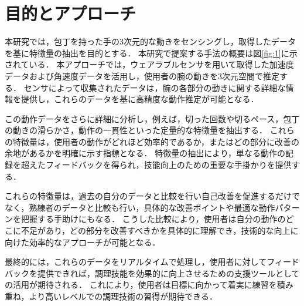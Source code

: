 \section{目的とアプローチ}
本研究では，包丁を持った手の3次元的な動きをセンシングし，取得したデータを基に特徴量の抽出を目的とする．
本研究で提案する手法の概要は図\ref{fig:1}に示されている．
本アプローチでは，ウェアラブルセンサを用いて取得した加速度データおよび角速度データを活用し，使用者の腕の動きを3次元空間で推定する．
センサによって収集されたデータは，腕の各部分の動きに関する詳細な情報を提供し，これらのデータを基に高精度な動作推定が可能となる．

この動作データをさらに詳細に分析し，例えば，切った回数や切るペース，包丁の動きの滑らかさ，動作の一貫性といった定量的な特徴量を抽出する．
これらの特徴量は，使用者の動作がどれほど効率的であるか，またはどの部分に改善の余地があるかを明確に示す指標となる．
特徴量の抽出により，単なる動作の記録を超えたフィードバックを得られ，技能向上のための重要な手掛かりを提供する．

これらの特徴量は，過去の自分のデータと比較を行い自己改善を促進するだけでなく，熟練者のデータと比較も行い，具体的な改善ポイントや最適な動作パターンを把握する手助けにもなる．
こうした比較により，使用者は自分の動作のどこに不足があり，どの部分を改善すべきかを具体的に理解でき，技術的な向上に向けた効率的なアプローチが可能となる．

最終的には，これらのデータをリアルタイムで処理し，使用者に対してフィードバックを提供できれば，調理技能を効果的に向上させるための支援ツールとしての活用が期待される．
これにより，使用者は目標に向かって着実に練習を積み重ね，より高いレベルでの調理技術の習得が期待できる．